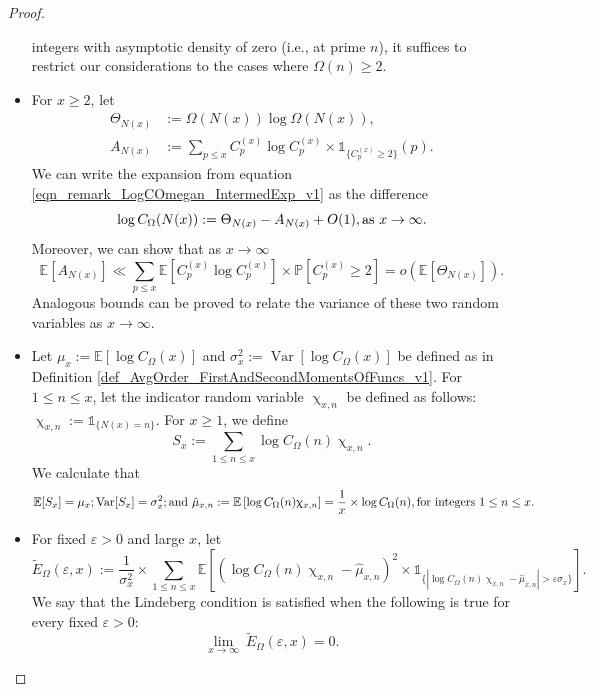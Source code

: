 \documentclass[11pt,reqno,a4letter]{article}
\newcommand{\hlocalref}[1]{\hyperref[#1]{\ref{#1}}}
\numberwithin{equation}{section}
\numberwithin{figure}{section}
\numberwithin{table}{section}
\renewcommand{\chi}{\upchi}
\theoremstyle{plain}
\numberwithin{theorem}{section}
\theoremstyle{definition}
\theoremstyle{remark}
\newcommand{\mathtext}[1]{\text{\rm #1}}
\begin{document}
\begin{proof}
\begin{itemize}
integers with asymptotic density of zero (i.e., at prime $n$), 
it suffices to restrict our considerations 
to the cases where $\Omega(n) \geq 2$. 
\item 
For $x \geq 2$, let 
\begin{align*}
\Theta_{N(x)} & := \Omega(N(x)) \log \Omega(N(x)), \\ 
A_{N(x)} & := \sum_{p \leq x} C_p^{(x)} \log C_p^{(x)} \times \mathds{1}_{\{C_p^{(x)} \geq 2\}}(p). 
\end{align*}
We can write the expansion from equation 
\eqref{eqn_remark_LogCOmegan_IntermedExp_v1} as the difference 
$$\log C_{\Omega}(N(x)) := \Theta_{N(x)} - A_{N(x)} + O(1), \mathtext{ as } x \rightarrow \infty.$$ 
Moreover, we can show that as $x \rightarrow \infty$ 
\[
\mathbb{E}[A_{N(x)}] \ll \sum_{p \leq x} \mathbb{E}\left[C_p^{(x)} \log C_p^{(x)}\right] 
     \times \mathbb{P}\left[C_p^{(x)} \geq 2\right] = o\left(\mathbb{E}[\Theta_{N(x)}]\right). 
\]
Analogous bounds can be proved to relate the variance of these 
two random variables as $x \rightarrow \infty$. 
\item 
Let $\mu_x := \mathbb{E}\left[\log C_{\Omega}(x)\right]$ and 
$\sigma_x^2 := \operatorname{Var}\left[\log C_{\Omega}(x)\right]$ be defined as in 
Definition \hlocalref{def_AvgOrder_FirstAndSecondMomentsOfFuncs_v1}. 
For $1 \leq n \leq x$, let the indicator random variable $\chi_{x,n}$ 
be defined as follows: $\chi_{x,n} := \mathds{1}_{\{N(x)=n\}}$. 
For $x \geq 1$, we define 
\[
S_x := \sum_{1 \leq n \leq x} \log C_{\Omega}(n) \chi_{x,n}. 
\]
We calculate that 
\[
\mathbb{E}[S_x] = \mu_x; \operatorname{Var}[S_x] = \sigma_x^2; 
     \mathtext{ and } 
     \hat{\mu}_{x,n} := \mathbb{E}\left[\log C_{\Omega}(n) \chi_{x,n}\right] = 
     \frac{1}{x} \times \log C_{\Omega}(n), 
     \mathtext{ for integers } 1 \leq n \leq x. 
\]
\item 
For fixed $\varepsilon > 0$ and large $x$, let 
\[
\widetilde{E}_{\Omega}(\varepsilon, x) := \frac{1}{\sigma_x^2} \times 
     \sum_{1 \leq n \leq x} \mathbb{E}\left[ 
     \left(\log C_{\Omega}(n) \chi_{x,n} - \hat{\mu}_{x,n}\right)^2 
     \times 
     \mathds{1}_{\{\left\lvert \log C_{\Omega}(n) \chi_{x,n} - \hat{\mu}_{x,n} \right\rvert > 
     \varepsilon \sigma_x\}}\right]. 
\]
We say that the Lindeberg condition is satisfied when the following 
is true for every fixed $\varepsilon > 0$: 
\begin{equation}
\label{eqn_ProofTag_LindebergCLTCond_Stmt_v1}
\lim_{x \rightarrow \infty}\ \widetilde{E}_{\Omega}(\varepsilon, x) = 0. 
\end{equation}

\end{itemize}
\end{proof}
\end{document}
